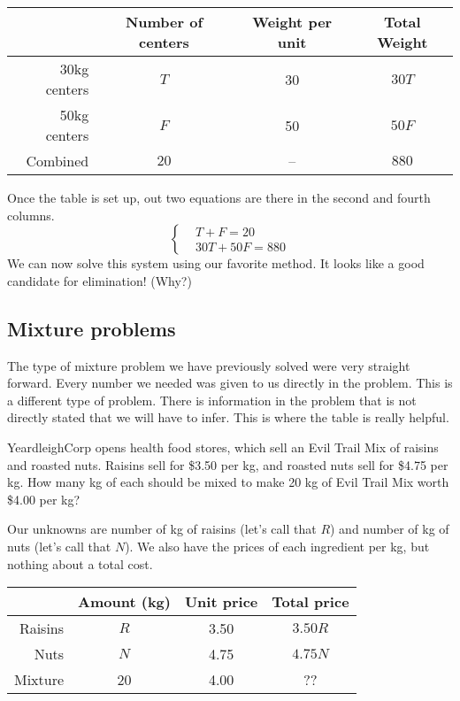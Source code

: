 \begin{center}
\begin{tabular}{r|ccc}
				& Number of centers	& Weight per unit	& Total Weight\\\hline
30kg centers	& $T$					& 30				& $30T$\\
50kg centers	& $F$					& 50				& $50F$\\
Combined		& $20$					& --				& $880$\\
\end{tabular}
\end{center}

Once the table is set up, out two equations are there in the second and fourth columns.
\[
\left\{%
\begin{aligned}
&T+F=20\\
&30T + 50F = 880
\end{aligned}
\right.
\] 
We can now solve this system using our favorite method. It looks like a good candidate for elimination! (Why?)

\subsection*{Mixture problems}

The type of mixture problem we have previously solved were very straight forward. Every number we needed was given to us directly in the problem. This is a different type of problem. There is information in the problem that is not directly stated that we will have to infer. This is where the table is really helpful.

\begin{boxex}
YeardleighCorp opens health food stores, which sell an Evil Trail Mix of raisins and roasted nuts. Raisins sell for \$3.50 per kg, and roasted nuts sell for \$4.75 per kg. How many kg of each should be mixed to make 20 kg of Evil Trail Mix worth \$4.00 per kg?
\end{boxex}

Our unknowns are number of kg of raisins (let's call that $R$) and number of kg of nuts (let's call that $N$). We also have the prices of each ingredient per kg, but nothing about a total cost.

\begin{center}
\begin{tabular}{r|ccc}
				& Amount (kg)			& Unit price			& Total price\\\hline
Raisins			& $R$					& 3.50				& $3.50R$\\
Nuts			& $N$					& 4.75				& $4.75N$\\
Mixture			& 20					& 4.00				& {\color{red} ??}\\
\end{tabular}
\end{center}

